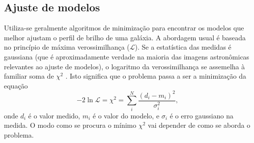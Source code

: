 \subsection{Ajuste de modelos}
\label{sec:morph:comp:ajuste}

Utiliza-se geralmente algoritmos de minimização para encontrar os modelos que
melhor ajustam o perfil de brilho de uma galáxia. A abordagem usual é baseada no
princípio de máxima verossimilhança ($\mathcal{L}$). Se a estatística das
medidas é gaussiana (que é aproximadamente verdade na maioria das imagens
astronômicas relevantes ao ajuste de modelos), o logaritmo da verossimilhança se
assemelha à familiar soma de $\chi^2$ \citep[seção 4.1.2]{Erwin2015}. Isto
significa que o problema passa a ser a minimização da equação
\begin{equation*}
-2\ln\mathcal{L} = \chi^2 = \sum_i^N \frac{\left(d_i -
m_i\right)^2}{\sigma_i^2},
\end{equation*}
onde $d_i$ é o valor medido, $m_i$ é o valor do modelo, e $\sigma_i$ é o erro
gaussiano na medida. O modo como se procura o mínimo $\chi^2$ vai depender de
como se aborda o problema.

